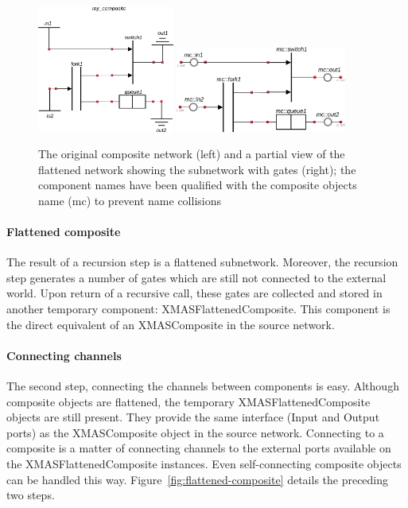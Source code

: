 \begin{figure}[ht]
\includegraphics[width=0.4\textwidth]{my_composite-network}
\hfill
\includegraphics[width=0.5\textwidth]{my_composite-gates}
  \caption{The original composite network (left) and a partial view of the flattened
  network showing the subnetwork with gates (right); the component names have been
  qualified with the composite objects name (mc) to prevent name collisions}
  \label{fig:mc-gates}
\end{figure}


\paragraph{Flattened composite}
The result of a recursion step is a flattened subnetwork. Moreover, the recursion
step generates a number of gates which are still not connected to the external
world. Upon return of a recursive call, these gates are collected and stored in
another temporary component: XMASFlattenedComposite. This component is the direct
equivalent of an XMASComposite in the source network.

\paragraph{Connecting channels}
The second step, connecting the channels between components is easy. Although
composite objects are flattened, the temporary XMASFlattenedComposite objects
are still present. They provide the same interface (Input and Output ports) as
the XMASComposite object in the source network. Connecting to a composite is a
matter of connecting channels to the external ports available on the
XMASFlattenedComposite instances. Even self-connecting composite objects can be
handled this way. Figure~\ref{fig:flattened-composite} details the preceding
two steps.

